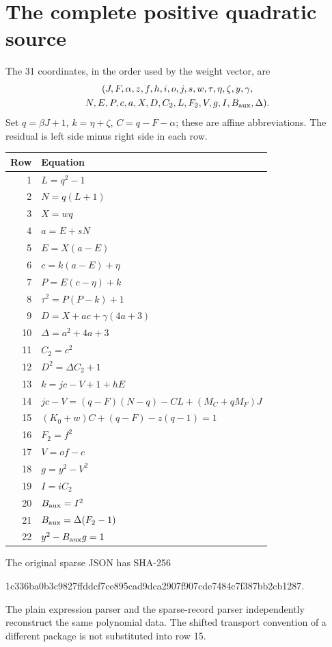 \documentclass[11pt,a4paper]{article}
\theoremstyle{definition}\newtheorem{definition}[theorem]{Definition}
\theoremstyle{remark}\newtheorem{remark}[theorem]{Remark}
\begin{document}
\appendix
\section{The complete positive quadratic source}\label{app:source}

The 31 coordinates, in the order used by the weight vector, are
\begin{gather*}
 (J,F,\alpha,z,f,h,i,o,j,s,w,\tau,\eta,\zeta,y,\gamma,\\
 N,E,P,c,a,X,D,C_2,L,F_2,V,g,I,B_{\rm aux},\Delta).
\end{gather*}
Set $q=\beta J+1$, $k=\eta+\zeta$, $C=q-F-\alpha$; these are affine
abbreviations. The residual is left side minus right side in each row.
\begin{longtable}{@{}r>{\raggedright\arraybackslash}p{}@{}}
\toprule Row & Equation\\\midrule\endhead
1 & $L=q^2-1$\\
2 & $N=q(L+1)$\\
3 & $X=wq$\\
4 & $a=E+sN$\\
5 & $E=X(a-E)$\\
6 & $c=k(a-E)+\eta$\\
7 & $P=E(c-\eta)+k$\\
8 & $\tau^2=P(P-k)+1$\\
9 & $D=X+ac+\gamma(4a+3)$\\
10 & $\Delta=a^2+4a+3$\\
11 & $C_2=c^2$\\
12 & $D^2=\Delta C_2+1$\\
13 & $k=jc-V+1+hE$\\
14 & $jc-V=(q-F)(N-q)-CL+(M_C+qM_F)J$\\
15 & $(K_0+w)C+(q-F)-z(q-1)=1$\\
16 & $F_2=f^2$\\
17 & $V=of-c$\\
18 & $g=y^2-V^2$\\
19 & $I=iC_2$\\
20 & $B_{\rm aux}=I^2$\\
21 & $B_{\rm aux}=\Delta(F_2-1)$\\
22 & $y^2-B_{\rm aux}g=1$\\
\bottomrule
\end{longtable}
The original sparse JSON has SHA-256
\begin{center}\small\ttfamily
1c336ba0b3c9827ffddcf7ce895cad9dca2907f907cde7484c7f387bb2cb1287.
\end{center}
The plain expression parser and the sparse-record parser independently
reconstruct the same polynomial data. The shifted transport convention
of a different package is not substituted into row 15.
\end{document}
